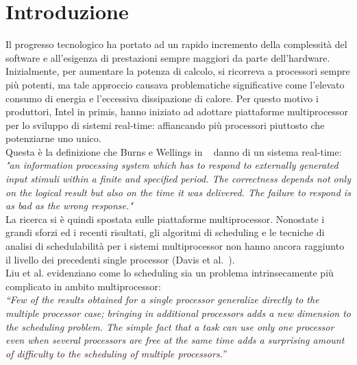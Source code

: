 


\section{Introduzione}
\label{sec:introduzione}

Il progresso tecnologico ha portato ad un rapido incremento della complessità del software e all'esigenza di prestazioni sempre maggiori da parte dell'hardware. Inizialmente, per aumentare la potenza di calcolo, si ricorreva a processori sempre più potenti, ma tale approccio causava problematiche significative come l'elevato consumo di energia e l'eccessiva dissipazione di calore. Per questo motivo i produttori, Intel in primis, hanno iniziato ad adottare piattaforme multiprocessor per lo sviluppo di sistemi real-time: affiancando più processori piuttosto che potenziarne uno unico.\\

Questa è la definizione che Burns e Wellings in ~\cite{Burns:2009:RSP:1643588} danno di un sistema real-time:\\

\textit{"an information processing system which has to respond to externally generated input stimuli within a finite and specified period. The correctness depends not only on the logical result but also on the time it was delivered. The failure to respond is as bad as the wrong response."}\\

La ricerca si è quindi spostata sulle piattaforme multiprocessor. Nonostate i grandi sforzi ed i recenti risultati, gli algoritmi di scheduling e le tecniche di analisi di schedulabilità per i sistemi multiprocessor non hanno ancora raggiunto il livello dei precedenti single processor (Davis et al.~\cite{Davis:2011:SHR:1978802.1978814}).\\

Liu et al.\cite{Liu:1973:SAM:321738.321743} evidenziano come lo scheduling sia un problema intrinsecamente più complicato in ambito multiprocessor:\\

\textit{“Few of the results obtained for a single processor generalize directly to the multiple processor case; bringing in additional processors adds a new dimension to the scheduling problem. The simple fact that a task can use only one processor even when several processors are free at the same time adds a surprising amount of difficulty to the scheduling of multiple processors.”}\\

